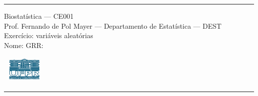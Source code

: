 \documentclass[a4paper,11pt,fleqn]{article}\usepackage[]{graphicx}\usepackage[]{color}
\theoremstyle{definition}
\begin{document}
\reversemarginpar %





\hrule
\vspace{0.3cm}

\begin{minipage}[c]{.85\textwidth}
  Biostatística --- CE001 \\
  Prof. Fernando de Pol Mayer --- Departamento de Estatística --- DEST \\
  Exercício: variáveis aleatórias \\
  Nome:   \hfill GRR: \hspace{2cm}
\end{minipage}\hfill
\begin{minipage}[c]{.15\textwidth}
\flushright
\includegraphics[width=2.2cm]{../img/ufpr-logo.png}
\end{minipage}

\vspace{0.3cm}
\hrule
\vspace{0.3cm}

\end{document}
